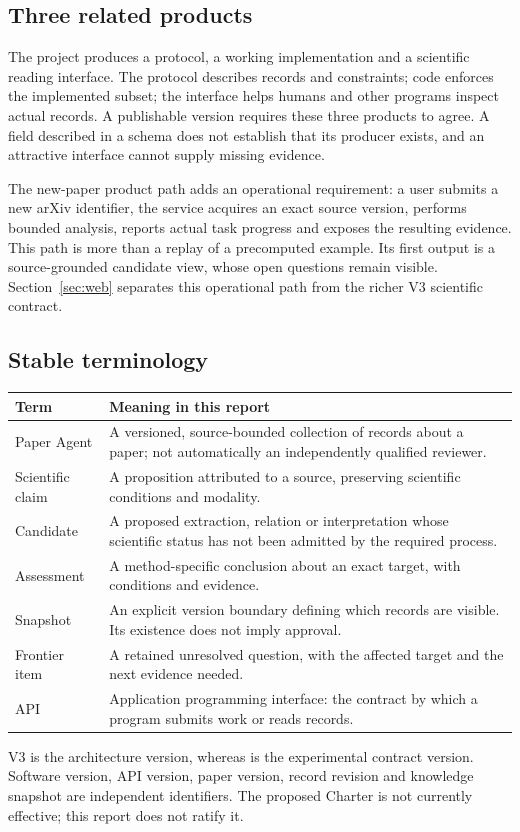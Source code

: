 \subsection{Three related products}

The project produces a protocol, a working implementation and a scientific reading interface. The protocol describes records and constraints; code enforces the implemented subset; the interface helps humans and other programs inspect actual records. A publishable version requires these three products to agree. A field described in a schema does not establish that its producer exists, and an attractive interface cannot supply missing evidence.

The new-paper product path adds an operational requirement: a user submits a new arXiv identifier, the service acquires an exact source version, performs bounded analysis, reports actual task progress and exposes the resulting evidence. This path is more than a replay of a precomputed example. Its first output is a source-grounded candidate view, whose open questions remain visible. Section~\ref{sec:web} separates this operational path from the richer V3 scientific contract.

\subsection{Stable terminology}

\begin{tabularx}{\linewidth}{@{}P{31mm}X@{}}
\toprule
Term & Meaning in this report \\
\midrule
Paper Agent & A versioned, source-bounded collection of records about a paper; not automatically an independently qualified reviewer. \\
Scientific claim & A proposition attributed to a source, preserving scientific conditions and modality. \\
Candidate & A proposed extraction, relation or interpretation whose scientific status has not been admitted by the required process. \\
Assessment & A method-specific conclusion about an exact target, with conditions and evidence. \\
Snapshot & An explicit version boundary defining which records are visible. Its existence does not imply approval. \\
Frontier item & A retained unresolved question, with the affected target and the next evidence needed. \\
API & Application programming interface: the contract by which a program submits work or reads records. \\
\bottomrule
\end{tabularx}

V3 is the architecture version, whereas \ContractVersion{} is the experimental contract version. Software version, API version, paper version, record revision and knowledge snapshot are independent identifiers. The proposed Charter is not currently effective; this report does not ratify it.
